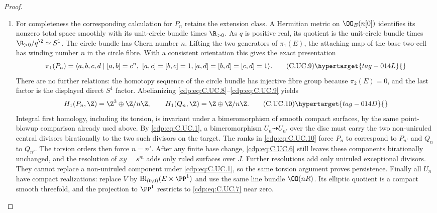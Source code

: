 \begin{proof}
\begin{enumerate}[label={$\langle1\rangle$\arabic*.},leftmargin=*]
\item For completeness the corresponding calculation
for $P_n$ retains the extension class. A Hermitian
metric on $\OO_E(n[0])$ identifies its nonzero
total space smoothly with its unit-circle bundle
times $\R_{>0}$. As $q$ is positive real, its
quotient is the unit-circle bundle times
$\R_{>0}/q^{\Z}\simeq S^1$. The circle bundle
has Chern number $n$. Lifting the two generators
of $\pi_1(E)$, the attaching map of the base
two-cell has winding number $n$ in the circle
fibre. With a consistent orientation this gives
the exact presentation
\[
 \pi_1(P_n)=
 \langle a,b,c,d\mid
 [a,b]=c^n,\ [a,c]=[b,c]=1,
 [a,d]=[b,d]=[c,d]=1\rangle.
\tag{C.UC.9}\hypertarget{tag-014L}{}\label{cdp:eq:C.UC.9}
\]
There are no further relations: the homotopy
sequence of the circle bundle has injective
fibre group because $\pi_2(E)=0$, and the last
factor is the displayed direct $S^1$ factor.
Abelianizing \eqref{cdp:eq:C.UC.8}--\eqref{cdp:eq:C.UC.9} yields
\[
 H_1(P_n,\Z)=\Z^3\oplus\Z/n\Z,
 \qquad H_1(Q_n,\Z)=\Z\oplus\Z/n\Z.
\tag{C.UC.10}\hypertarget{tag-014D}{}\label{cdp:eq:C.UC.10}
\]
Integral first homology, including its torsion,
is invariant under a bimeromorphism of smooth
compact surfaces, by the same point-blowup
comparison already used above. By \eqref{cdp:eq:C.UC.1},
a bimeromorphism $U_n\dashrightarrow U_{n'}$
over the disc must carry the two non-uniruled
central divisors birationally to the two such
divisors on the target. The ranks in \eqref{cdp:eq:C.UC.10}
force $P_n$ to correspond to $P_{n'}$ and
$Q_n$ to $Q_{n'}$. The torsion orders then
force $n=n'$. After any finite base change,
\eqref{cdp:eq:C.UC.6} still leaves these components
birationally unchanged, and the resolution of
$xy=s^m$ adds only ruled surfaces over $J$.
Further resolutions add only uniruled
exceptional divisors. They cannot replace a
non-uniruled component under \eqref{cdp:eq:C.UC.1}, so
the same torsion argument proves persistence.
Finally all $U_n$ have compact realizations:
replace $V$ by
$\operatorname{Bl}_{(0,0)}(E\times\PP^1)$
and use the same line bundle $\OO(nR)$.
Its elliptic quotient is a compact smooth
threefold, and the projection to $\PP^1$
restricts to \eqref{cdp:eq:C.UC.7} near zero.

\end{enumerate}
\end{proof}